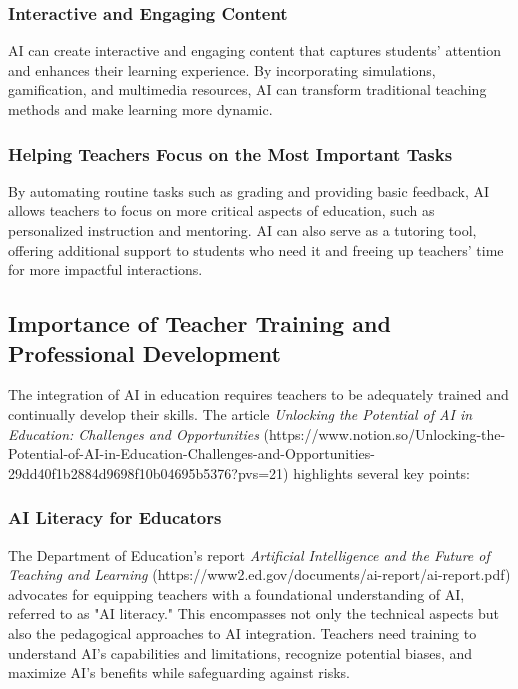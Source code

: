 \documentclass{article}
\begin{document}
\subsubsection{Interactive and Engaging Content}

AI can create interactive and engaging content that captures students' attention and enhances their learning experience. By incorporating simulations, gamification, and multimedia resources, AI can transform traditional teaching methods and make learning more dynamic.

\subsubsection{Helping Teachers Focus on the Most Important Tasks}

By automating routine tasks such as grading and providing basic feedback, AI allows teachers to focus on more critical aspects of education, such as personalized instruction and mentoring. AI can also serve as a tutoring tool, offering additional support to students who need it and freeing up teachers' time for more impactful interactions.

\subsection{Importance of Teacher Training and Professional Development}

The integration of AI in education requires teachers to be adequately trained and continually develop their skills. The article \textit{Unlocking the Potential of AI in Education: Challenges and Opportunities} (https://www.notion.so/Unlocking-the-Potential-of-AI-in-Education-Challenges-and-Opportunities-29dd40f1b2884d9698f10b04695b5376?pvs=21) highlights several key points:

\subsubsection{AI Literacy for Educators}

The Department of Education's report \textit{Artificial Intelligence and the Future of Teaching and Learning} (https://www2.ed.gov/documents/ai-report/ai-report.pdf) advocates for equipping teachers with a foundational understanding of AI, referred to as "AI literacy." This encompasses not only the technical aspects but also the pedagogical approaches to AI integration. Teachers need training to understand AI's capabilities and limitations, recognize potential biases, and maximize AI's benefits while safeguarding against risks.
\end{document}
